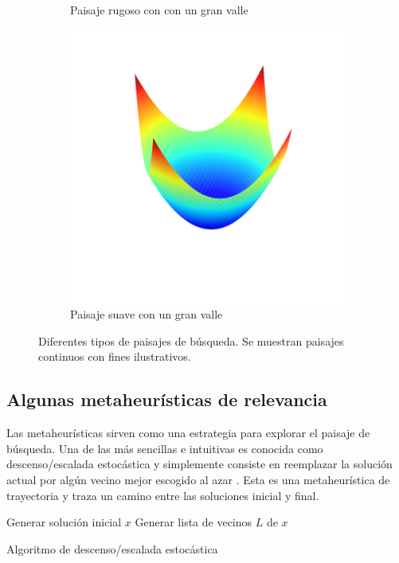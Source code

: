 \begin{figure}[]
\begin{subfigure}{.5\textwidth}
    \caption{Paisaje rugoso con con un gran valle}
\end{subfigure}
\begin{subfigure}{\textwidth}
    \centering
    \includegraphics[scale=.4]{Imagenes/smoothvalley.png}
    \caption{Paisaje suave con un gran valle}
\end{subfigure}
\caption{Diferentes tipos de paisajes de búsqueda. Se muestran paisajes continuos con fines ilustrativos.}
    \label{fig:landtypes}
\end{figure}

\subsection*{Algunas metaheurísticas de relevancia}
Las metaheurísticas sirven como una estrategia para explorar el paisaje de búsqueda. 
%
Una de las más sencillas e intuitivas es conocida como descenso/escalada estocástica y simplemente consiste en reemplazar la solución actual por algún vecino mejor 
escogido al azar .%
Esta es una metaheurística de trayectoria y traza un camino entre las soluciones inicial y final.

%
\begin{algorithm}[H]
 Generar solución inicial $x$\;
 Generar lista de vecinos $L$ de $x$\;
    \label{alg:LS}
    \caption{Algoritmo de descenso/escalada estocástica}
\end{algorithm}

